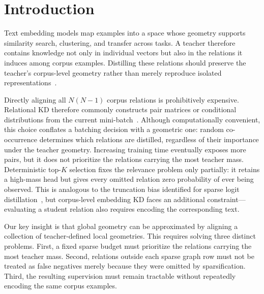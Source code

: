 \section{Introduction}

Text embedding models map examples into a space whose geometry supports similarity search, clustering, and transfer across tasks. A teacher therefore contains knowledge not only in individual vectors but also in the relations it induces among corpus examples. Distilling these relations should preserve the teacher's corpus-level geometry rather than merely reproduce isolated representations~\citep{tung2019similarity,park2019rkd,passalis2020pkt,kim2023embeddistill,kim2024topkd}.

Directly aligning all $N(N-1)$ corpus relations is prohibitively expensive. Relational KD therefore commonly constructs pair matrices or conditional distributions from the current mini-batch~\citep{tung2019similarity,park2019rkd,passalis2020pkt,qian2022fullkernel,xin2025nrkd}. Although computationally convenient, this choice conflates a batching decision with a geometric one: random co-occurrence determines which relations are distilled, regardless of their importance under the teacher geometry. Increasing training time eventually exposes more pairs, but it does not prioritize the relations carrying the most teacher mass. Deterministic top-$K$ selection fixes the relevance problem only partially: it retains a high-mass head but gives every omitted relation zero probability of ever being observed. This is analogous to the truncation bias identified for sparse logit distillation~\citep{anshumann2025sparse}, but corpus-level embedding KD faces an additional constraint---evaluating a student relation also requires encoding the corresponding text.

Our key insight is that global geometry can be approximated by aligning a collection of teacher-defined local geometries. This requires solving three distinct problems. First, a fixed sparse budget must prioritize the relations carrying the most teacher mass. Second, relations outside each sparse graph row must not be treated as false negatives merely because they were omitted by sparsification. Third, the resulting supervision must remain tractable without repeatedly encoding the same corpus examples.

